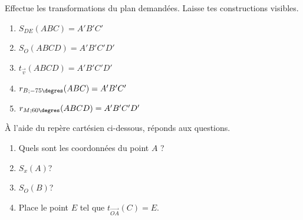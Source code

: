 \begin{exercise}[points=10]
    Effectue les transformations du plan demandées. Laisse tes constructions visibles.
    \begin{enumerate}
        \item $S_{DE}(ABC)=A'B'C'$
              \begin{center}
                  
              \end{center}
        \item $S_{O}(ABCD)=A'B'C'D'$
              \begin{center}
                  
              \end{center}
        \item $t_{\overrightarrow{v}}(ABCD)=A'B'C'D'$
              \begin{center}
                  
              \end{center}
              \newpage
        \item $r_{B;-75\degres}(ABC)=A'B'C'$
              \begin{center}
                  
              \end{center}
        \item $r_{M;60\degres}(ABCD)=A'B'C'D'$
              \begin{center}
                  
              \end{center}
    \end{enumerate}
\end{exercise}
\begin{solution}
\end{solution}

\newpage
\begin{exercise}[points=2]
    À l'aide du repère cartésien ci-dessous, réponds aux questions.
    \begin{center}
        
    \end{center}
    \begin{enumerate}
        \item Quels sont les coordonnées du point $A$ ? 
        \item $S_x(A)$?
        \item $S_O(B)$?
        \item Place le point $E$ tel que $t_{\overrightarrow{OA}}(C)=E$.
    \end{enumerate}
\end{exercise}
